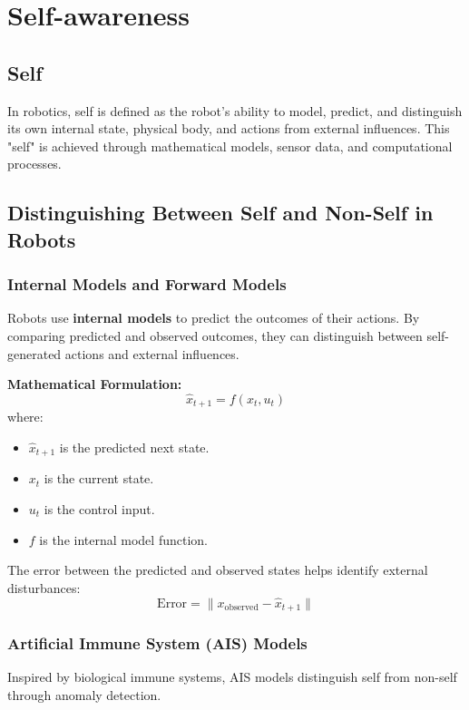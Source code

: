 \usepackage{amsmath}\chapter{Self-awareness}
\section{Self}
In robotics, self is defined as the robot's ability to model, predict, and distinguish its own internal state, physical body, and actions from external influences. This "self" is achieved through mathematical models, sensor data, and computational processes.
\section{Distinguishing Between Self and Non-Self in Robots}
\subsection{Internal Models and Forward Models}
Robots use \textbf{internal models} to predict the outcomes of their actions. By comparing predicted and observed outcomes, they can distinguish between self-generated actions and external influences.

\textbf{Mathematical Formulation:}
\begin{equation}
\hat{x}_{t+1} = f(x_t, u_t)
\end{equation}
where:
\begin{itemize}
    \item \( \hat{x}_{t+1} \) is the predicted next state.
    \item \( x_t \) is the current state.
    \item \( u_t \) is the control input.
    \item \( f \) is the internal model function.
\end{itemize}
The error between the predicted and observed states helps identify external disturbances:
\begin{equation}
\text{Error} = \| x_{\text{observed}} - \hat{x}_{t+1} \|
\end{equation}

\subsection{Artificial Immune System (AIS) Models}
Inspired by biological immune systems, AIS models distinguish self from non-self through anomaly detection.

